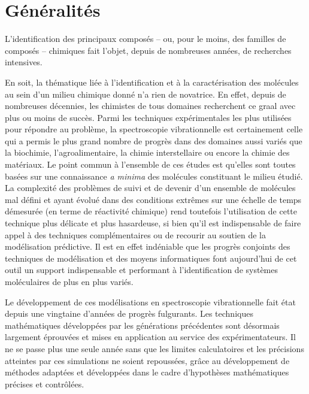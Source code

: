\section{Généralités}

L'identification des principaux composés -- ou, pour le moins, des familles de composés -- chimiques fait l'objet, depuis de nombreuses années, de recherches intensives.

En soit, la thématique liée à l'identification et à la caractérisation des molécules au sein d'un milieu chimique donné n'a rien de novatrice. En effet, depuis de nombreuses décennies, les chimistes de tous domaines recherchent ce \og graal \fg{} avec plus ou moins de succès. Parmi les techniques expérimentales les plus utilisées pour répondre au problème, la spectroscopie vibrationnelle est certainement celle qui a permis le plus grand nombre de progrès dans des domaines aussi variés que la biochimie, l'agroalimentaire, la chimie interstellaire ou encore la chimie des matériaux. Le point commun à l'ensemble de ces études est qu'elles sont toutes basées sur une connaissance \textit{a minima} des molécules constituant le milieu étudié. La complexité des problèmes de suivi et de devenir d’un ensemble de molécules mal défini et ayant évolué dans des conditions extrêmes sur une échelle de temps démesurée (en terme de réactivité chimique) rend toutefois l'utilisation de cette technique plus délicate et plus hasardeuse, si bien qu'il est indispensable de faire appel à des techniques complémentaires ou de recourir au soutien de la modélisation prédictive. Il est en effet indéniable que les progrès conjoints des techniques de modélisation et des moyens informatiques font aujourd'hui de cet outil un support indispensable et performant à l'identification de systèmes moléculaires de plus en plus variés.

Le développement de ces modélisations en spectroscopie vibrationnelle fait état depuis une vingtaine d'années de progrès fulgurants. Les techniques mathématiques développées par les générations précédentes sont désormais largement éprouvées et mises en application au service des expérimentateurs.
Il ne se passe plus une seule année sans que les limites calculatoires et les précisions atteintes par ces simulations ne soient repoussées, grâce au développement de méthodes adaptées et développées dans le cadre d'hypothèses mathématiques précises et contrôlées. \\

